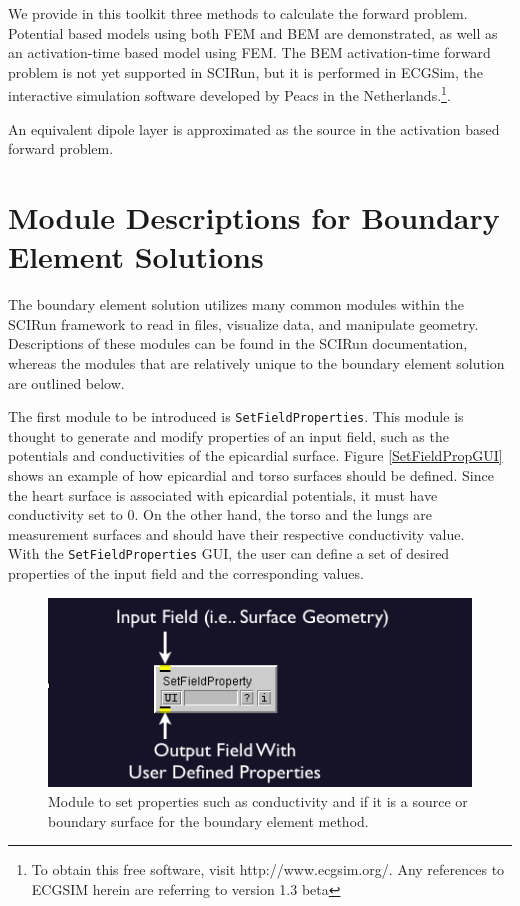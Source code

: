 We provide in this toolkit three methods to calculate the forward problem. Potential based models using both FEM and BEM are demonstrated, as well as an activation-time based model using FEM. The BEM activation-time forward problem is not yet supported in SCIRun, but it is performed in ECGSim, the interactive simulation software developed by Peacs in the Netherlands.\footnote{To obtain this free software, visit http://www.ecgsim.org/. Any references to ECGSIM herein are referring to version 1.3 beta}.


An equivalent dipole layer is approximated as the source in the activation based forward problem.


\section{Module Descriptions for Boundary Element Solutions}

The boundary element solution utilizes many common modules within the SCIRun framework
to read in files, visualize data, and manipulate geometry. Descriptions of these modules
can be found in the SCIRun documentation, whereas the modules that are relatively unique to the boundary element solution are outlined below.

The first module to be introduced is {\tt SetFieldProperties}. This module is thought to generate and modify properties of an input field, such as the potentials and conductivities of
the epicardial surface. Figure \ref{SetFieldPropGUI} shows an example of how epicardial and torso surfaces should be defined. Since the heart surface is associated with epicardial potentials,
it must have conductivity set to 0. On the other hand, the torso and the lungs are measurement surfaces and should have their respective conductivity value.\\
With the {\tt SetFieldProperties} GUI, the user can define a set of desired properties of the input field and the corresponding values.

\begin{figure}[H]
\begin{center}
\includegraphics[width=12 cm]{ECGToolkitGuide_figures/SetFieldProps.png}
\caption{Module to set properties such as conductivity and if it is a source or boundary surface for the boundary element method.}
\label{SetFieldProp}
\end{center}
\end{figure}

